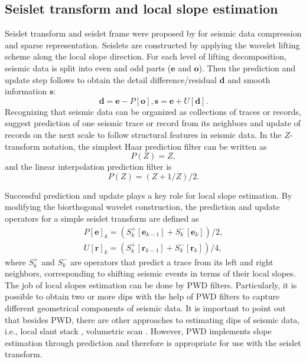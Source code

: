 \subsection{Seislet transform and local slope estimation}

Seislet transform and seislet frame were proposed by \cite{fomel2010seislet} for seismic data compression and sparse representation. Seislets are constructed by applying the wavelet lifting scheme \citep{sweldens1998lifting} along the local slope direction. For each level of lifting decomposition, seismic data is split into even and odd parts ($\mathbf{e}$ and $\mathbf{o}$). Then the prediction and update step follows to obtain the detail difference/residual $\mathbf{d}$ and smooth information $\mathbf{s}$:
\begin{equation}
\mathbf{d}=\mathbf{e}-P[\mathbf{o}],\mathbf{s}=\mathbf{e}+U[\mathbf{d}].
\end{equation}
Recognizing that seismic data can be organized as collections of traces or records, \cite{fomel2010seislet} suggest prediction of one seismic trace or record from its neighbors and update of records on the next scale to follow structural features in seismic data. In the $Z$-transform notation, the simplest Haar prediction filter can be written as
\begin{equation}
 P(Z)=Z,
\end{equation}
and the linear interpolation prediction filter is
\begin{equation}
 P(Z)=(Z+1/Z)/2.
\end{equation}

Successful prediction and update plays a key role for local slope estimation. By modifying the biorthogonal wavelet construction, the prediction and update operators for a simple seislet transform are defined as
\begin{equation}
\begin{split}
 P[\mathbf{e}]_k=(S_k^{+}[\mathbf{e}_{k-1}] + S_{k}^{-} [\mathbf{e}_k]) /2,\\
 U[\mathbf{r}]_k=(S_k^{+}[\mathbf{r}_{k-1}] + S_{k}^{-} [\mathbf{r}_k]) /4,
\end{split}
\end{equation}
where $S_k^{+}$ and $S_k^{-}$ are operators that predict a trace from its left and right neighbors, corresponding to shifting seismic events in terms of their local slopes. The job of local slopes estimation can be done by PWD filters. Particularly, it is possible to obtain two or more dips with the help of PWD filters to capture different geometrical components of seismic data. It is important to point out that besides PWD, there are other approaches to estimating dips of seismic data, i.e., local slant stack \citep{ottolini1983signal}, volumetric scan \citep{marfurt2006robust}. However, PWD implements slope estimation through prediction and therefore is appropriate for use with the seislet transform.


